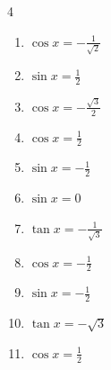 \begin{multicols}{4}
\begin{enumerate}
  \item $\displaystyle \cos{x}  = -\frac{1}{\sqrt{2}}$


  \item $\displaystyle \sin{x}  = \frac{1}{2}$


  \item $\displaystyle \cos{x}  = -\frac{\sqrt{3}}{2}$


  \item $\displaystyle \cos{x}  = \frac{1}{2}$


  \item $\displaystyle \sin{x}  = -\frac{1}{2}$


  \item $\displaystyle \sin{x}  = 0$


  \item $\displaystyle \tan{x}  = -\frac{1}{\sqrt{3}}$


  \item $\displaystyle \cos{x}  = -\frac{1}{2}$


  \item $\displaystyle \sin{x}  = -\frac{1}{2}$


\columnbreak %

  \item $\displaystyle \tan{x}  = -\sqrt{3}$


  \item $\displaystyle \cos{x}  = \frac{1}{2}$



\end{enumerate}
\end{multicols}
